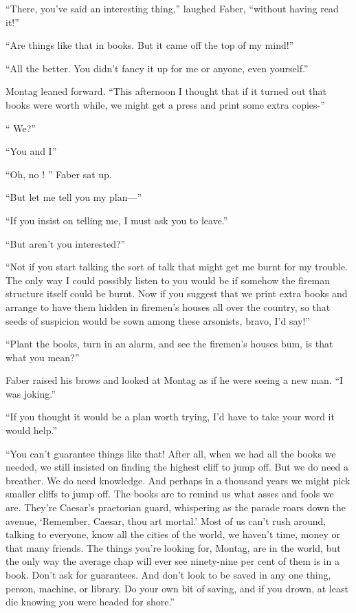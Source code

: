 \documentclass[11pt,openany]{book}
\begin{document}
``There, you've said an interesting thing,'' laughed Faber, ``without having read it!''

``Are things like that in books. But it came off the top of my mind!''

``All the better. You didn't fancy it up for me or anyone, even yourself.''

Montag leaned forward. ``This afternoon I thought that if it turned out that books were worth while, we might get a press and print some extra copies-''

`` We?''

``You and I''

``Oh, no ! '' Faber sat up.

``But let me tell you my plan---''

``If you insist on telling me, I must ask you to leave.''

``But aren't you interested?''

``Not if you start talking the sort of talk that might get me burnt for my trouble. The only way I could possibly listen to you would be if somehow the fireman structure itself could be burnt. Now if you suggest that we print extra books and arrange to have them hidden in firemen's houses all over the country, so that seeds of suspicion would be sown among these arsonists, bravo, I'd say!''

``Plant the books, turn in an alarm, and see the firemen's houses bum, is that what you mean?''

Faber raised his brows and looked at Montag as if he were seeing a new man. ``I was joking.''

``If you thought it would be a plan worth trying, I'd have to take your word it would help.''

``You can't guarantee things like that! After all, when we had all the books we needed, we still insisted on finding the highest cliff to jump off. But we do need a breather. We do need knowledge. And perhaps in a thousand years we might pick smaller cliffs to jump off. The books are to remind us what asses and fools we are. They're Caesar's praetorian guard, whispering as the parade roars down the avenue, `Remember, Caesar, thou art mortal.' Most of us can't rush around, talking to everyone, know all the cities of the world, we haven't time, money or that many friends. The things you're looking for, Montag, are in the world, but the only way the average chap will ever see ninety-nine per cent of them is in a book. Don't ask for guarantees. And don't look to be saved in any one thing, person, machine, or library. Do your own bit of saving, and if you drown, at least die knowing you were headed for shore.''
\end{document}
